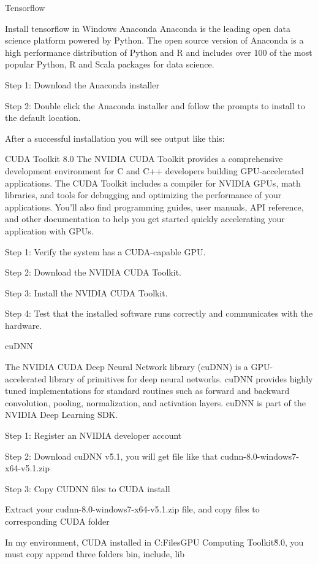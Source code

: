 Tensorflow

Install tensorflow in Windows
Anaconda
Anaconda is the leading open data science platform powered by Python. The open source version of Anaconda is a high performance distribution of Python and R and includes over 100 of the most popular Python, R and Scala packages for data science.

Step 1: Download the Anaconda installer

Step 2: Double click the Anaconda installer and follow the prompts to install to the default location.

After a successful installation you will see output like this:



CUDA Toolkit 8.0
The NVIDIA CUDA Toolkit provides a comprehensive development environment for C and C++ developers building GPU-accelerated applications. The CUDA Toolkit includes a compiler for NVIDIA GPUs, math libraries, and tools for debugging and optimizing the performance of your applications. You’ll also find programming guides, user manuals, API reference, and other documentation to help you get started quickly accelerating your application with GPUs.

Step 1: Verify the system has a CUDA-capable GPU.

Step 2: Download the NVIDIA CUDA Toolkit.

Step 3: Install the NVIDIA CUDA Toolkit.

Step 4: Test that the installed software runs correctly and communicates with the hardware.

cuDNN

The NVIDIA CUDA Deep Neural Network library (cuDNN) is a GPU-accelerated library of primitives for deep neural networks. cuDNN provides highly tuned implementations for standard routines such as forward and backward convolution, pooling, normalization, and activation layers. cuDNN is part of the NVIDIA Deep Learning SDK.

Step 1: Register an NVIDIA developer account

Step 2: Download cuDNN v5.1, you will get file like that cudnn-8.0-windows7-x64-v5.1.zip


Step 3: Copy CUDNN files to CUDA install

Extract your cudnn-8.0-windows7-x64-v5.1.zip file, and copy files to corresponding CUDA folder

In my environment, CUDA installed in C:\Program Files\NVIDIA GPU Computing Toolkit\CUDA\v8.0, you must copy append three folders bin, include, lib



